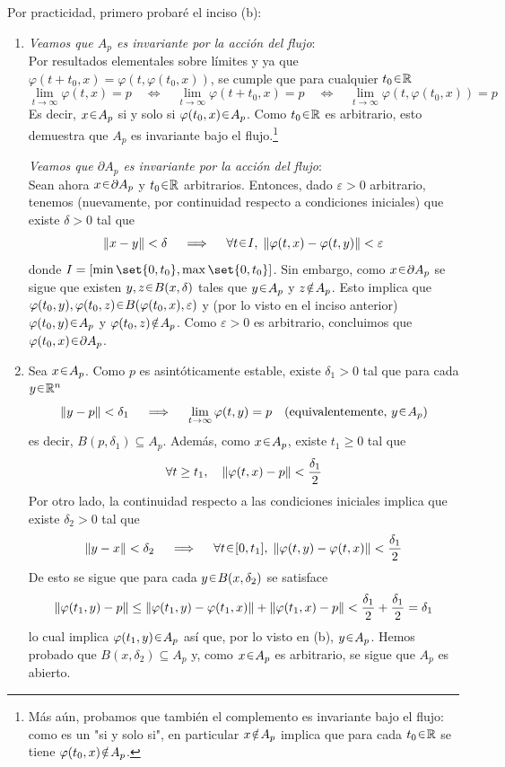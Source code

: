 \begin{sol}[Demostración]
Por practicidad, primero probaré el inciso (b):
\begin{enumerate}
\item[(b)] \emph{Veamos que $A_p$ es invariante por la acción del flujo}:\\
Por resultados elementales sobre límites y ya que $\varphi(t+t_0,x) = \varphi(t,\varphi(t_0,x))$, se cumple que para cualquier $t_0 \en \mathbb{R}$
\[
\lim_{t\to\infty}\varphi(t,x) = p%
\quad\iff\quad%
\lim_{t\to\infty}\varphi(t + t_0,x) = p%
\quad\iff\quad%
\lim_{t\to\infty}\varphi(t, \varphi(t_0,x)) = p
\]
Es decir, $x \en A_p$ si y solo si $\varphi(t_0,x) \en A_p$. Como $t_0 \en \mathbb{R}$ es arbitrario, esto demuestra que $A_p$ es invariante bajo el flujo.\footnote{Más aún, probamos que también el complemento es invariante bajo el flujo: como es un "si y solo si", en particular $x \noten A_p$ implica que para cada $t_0 \en \mathbb{R}$ se tiene $\varphi(t_0,x) \noten A_p$.}\par
\emph{Veamos que $\partial A_p$ es invariante por la acción del flujo}:\\
Sean ahora $x \en \partial A_p$ y $t_0 \en \mathbb{R}$ arbitrarios. Entonces, dado $\varepsilon > 0$ arbitrario, tenemos (nuevamente, por continuidad respecto a condiciones iniciales) que existe $\delta > 0$ tal que
\[
\norm{x - y} < \delta%
\quad\implies\quad%
\forall t \en I,\; \norm{\varphi(t,x) - \varphi(t,y)} < \varepsilon
\]
donde $I = [\min\set{0,t_0},\max\set{0,t_0}]$. Sin embargo, como $x \en \partial A_p$ se sigue que existen $y,z \en B(x,\delta)$ tales que $y \en A_p$ y $z \noten A_p$. Esto implica que $\varphi(t_0,y), \varphi(t_0,z) \en B(\varphi(t_0,x), \varepsilon)$ y (por lo visto en el inciso anterior) $\varphi(t_0,y) \en A_p$ y $\varphi(t_0,z) \noten A_p$. Como $\varepsilon>0$ es arbitrario, concluimos que $\varphi(t_0,x) \en \partial A_p$.

\item[(a)] Sea $x \en A_p$. Como $p$ es asintóticamente estable, existe $\delta_1 > 0$ tal que para cada $y \en \mathbb{R}^n$
\[
\norm{y-p} < \delta_1%
\quad\implies\quad%
\lim_{t \to \infty} \varphi(t,y) = p%
\quad\text{(equivalentemente, $y \en A_p$)}
\]
es decir, $B(p,\delta_1) \subseteq A_p$. Además, como $x \en A_p$, existe $t_1 \geq 0$ tal que
\[
\forall t\geq t_1, \quad\norm{\varphi(t,x) - p} < \frac{\delta_1}{2}
\]
Por otro lado, la continuidad respecto a las condiciones iniciales implica que existe $\delta_2 > 0$ tal que
\[
\norm{y - x} < \delta_2%
\quad\implies\quad%
\forall t\en[0,t_1],\;\norm{\varphi(t,y) - \varphi(t,x)} < \frac{\delta_1}{2}
\]
De esto se sigue que para cada $y \en B(x, \delta_2)$ se satisface
\[
\norm{\varphi(t_1,y) - p} \leq \norm{\varphi(t_1,y) - \varphi(t_1,x)} + \norm{\varphi(t_1,x) - p} < \frac{\delta_1}{2} + \frac{\delta_1}{2} = \delta_1
\]
lo cual implica $\varphi(t_1,y) \en A_p$
así que, por lo visto en (b), $y \en A_p$. Hemos probado que $B(x,\delta_2) \subseteq A_p$ y, como $x \en A_p$ es arbitrario, se sigue que $A_p$ es abierto.


\end{enumerate}
\end{sol}
